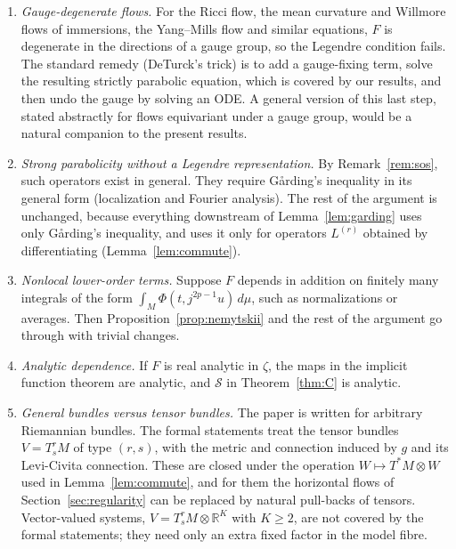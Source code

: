 \documentclass[11pt,reqno]{amsart}
\theoremstyle{definition}
\theoremstyle{remark}
\newcommand{\R}{\mathbb{R}}
\newcommand{\dmu}{\,d\mu}
\numberwithin{equation}{section}
\begin{document}
\begin{enumerate}[label=(\arabic*)]
\item \emph{Gauge-degenerate flows.} For the Ricci flow, the mean curvature and Willmore flows of
  immersions, the Yang--Mills flow and similar equations, $F$ is degenerate in the directions of a gauge
  group, so the Legendre condition fails. The standard remedy (DeTurck's trick) is to add a
  gauge-fixing term, solve the resulting strictly parabolic equation, which is covered by our results,
  and then undo the gauge by solving an ODE. A general version of this last step, stated abstractly
  for flows equivariant under a gauge group, would be a natural companion to the present results.
\item \emph{Strong parabolicity without a Legendre representation.} By Remark~\ref{rem:sos}, such
  operators exist in general. They require G\aa rding's inequality in its general form (localization
  and Fourier analysis). The rest of the argument is unchanged, because everything downstream of
  Lemma~\ref{lem:garding} uses only G\aa rding's inequality, and uses it only for operators
  $L^{(r)}$ obtained by differentiating (Lemma~\ref{lem:commute}).
\item \emph{Nonlocal lower-order terms.} Suppose $F$ depends in addition on finitely many
  integrals of the form $\int_M\Phi(t,j^{2p-1}u)\dmu$, such as normalizations or averages. Then
  Proposition~\ref{prop:nemytskii} and the rest of the argument go through with trivial changes.
\item \emph{Analytic dependence.} If $F$ is real analytic in $\zeta$, the maps in the implicit function
  theorem are analytic, and $\mathcal S$ in Theorem~\ref{thm:C} is analytic.
\item \emph{General bundles versus tensor bundles.} The paper is written for arbitrary Riemannian
  bundles. The formal statements treat the tensor bundles $V=T^r_sM$ of type $(r,s)$, with the
  metric and connection induced by $g$ and its Levi-Civita connection. These are closed under the
  operation $W\mapsto T^*M\otimes W$ used in Lemma~\ref{lem:commute}, and for them the horizontal
  flows of Section~\ref{sec:regularity} can be replaced by natural pull-backs of tensors.
  Vector-valued systems, $V=T^r_sM\otimes\R^K$ with $K\ge2$, are not covered by the formal
  statements; they need only an extra fixed factor in the model fibre.
\end{enumerate}

\end{document}

